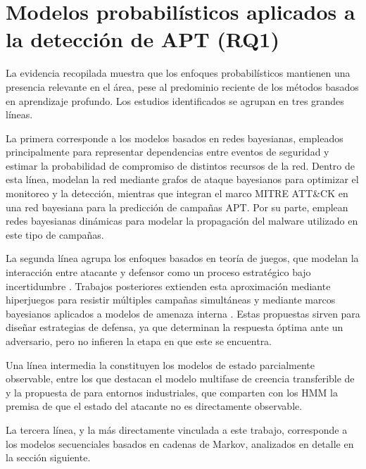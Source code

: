 \clearpage

\FloatBarrier

\newpage
\section{Modelos probabilísticos aplicados a la detección de APT (RQ1)}

La evidencia recopilada muestra que los enfoques probabilísticos mantienen una presencia relevante en el área, pese al predominio reciente de los métodos basados en aprendizaje profundo. Los estudios identificados se agrupan en tres grandes líneas.

La primera corresponde a los modelos basados en redes bayesianas, empleados principalmente para representar dependencias entre eventos de seguridad y estimar la probabilidad de compromiso de distintos recursos de la red. Dentro de esta línea, \textcite{kazeminajafabadi_optimal_2023} modelan la red mediante grafos de ataque bayesianos para optimizar el monitoreo y la detección, mientras que \textcite{kim_ban_2023} integran el marco MITRE ATT\&CK en una red bayesiana para la predicción de campañas APT. Por su parte, \textcite{guillen_propagation_2021} emplean redes bayesianas dinámicas para modelar la propagación del malware utilizado en este tipo de campañas.

La segunda línea agrupa los enfoques basados en teoría de juegos, que modelan la interacción entre atacante y defensor como un proceso estratégico bajo incertidumbre \parencite{rass_defending_2017}. Trabajos posteriores extienden esta aproximación mediante hiperjuegos para resistir múltiples campañas simultáneas \parencite{wan_resisting_2023} y mediante marcos bayesianos aplicados a modelos de amenaza interna \parencite{jiao_bg-flipin_2026}. Estas propuestas sirven para diseñar estrategias de defensa, ya que determinan la respuesta óptima ante un adversario, pero no infieren la etapa en que este se encuentra.

Una línea intermedia la constituyen los modelos de estado parcialmente observable, entre los que destacan el modelo multifase de creencia transferible de \textcite{g_ioannou_markov_2019} y la propuesta de \textcite{zhang_secaas-based_2024} para entornos industriales, que comparten con los HMM la premisa de que el estado del atacante no es directamente observable.

La tercera línea, y la más directamente vinculada a este trabajo, corresponde a los modelos secuenciales basados en cadenas de Markov, analizados en detalle en la sección siguiente.

